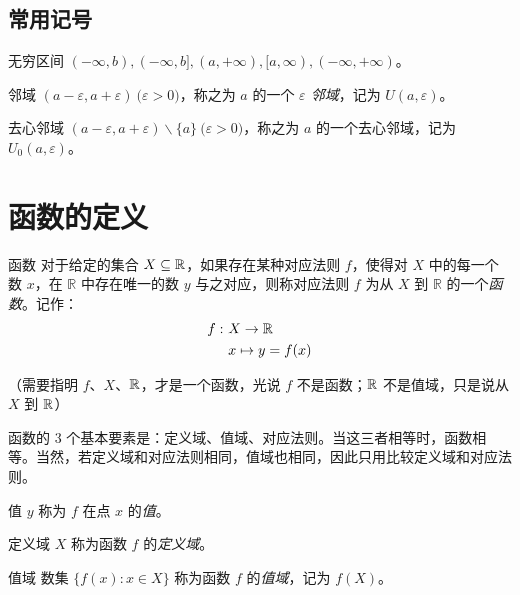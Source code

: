 \subsection{常用记号}

\begin{definition}{无穷区间}
	$(-\infty, b), (-\infty, b], (a, +\infty), [a, \infty), (-\infty, +\infty)$。
\end{definition}

\begin{definition}{邻域}
	$(a - \varepsilon, a + \varepsilon) \pod{\varepsilon > 0}$，称之为 $a$ 的一个 \emph{$\varepsilon$ 邻域}，记为 $U(a, \varepsilon)$。
\end{definition}

\begin{definition}{去心邻域}
	$(a - \varepsilon, a + \varepsilon) \backslash \{ a \} \pod{\varepsilon > 0}$，称之为 $a$ 的一个去心邻域，记为 $U_0(a, \varepsilon)$。
\end{definition}

\section{函数的定义}

\begin{definition}{函数}
	对于给定的集合 $X \subseteq \mathbb R$，如果存在某种对应法则 $f$，使得对 $X$ 中的每一个数 $x$，在 $\mathbb R$ 中存在唯一的数 $y$ 与之对应，则称对应法则 $f$ 为从 $X$ 到 $\mathbb R$ 的一个\emph{函数}。记作：
	$$
	\begin{aligned}
		f:~&X \rightarrow \mathbb R
		\\&
		x \mapsto y = f(x)
	\end{aligned}
	$$

	（需要指明 $f$、$X$、$\mathbb R$，才是一个函数，光说 $f$ 不是函数；$\mathbb R$ 不是值域，只是说从 $X$ 到 $\mathbb R$）
\end{definition}

函数的 3 个基本要素是：定义域、值域、对应法则。当这三者相等时，函数相等。当然，若定义域和对应法则相同，值域也相同，因此只用比较定义域和对应法则。

\begin{definition}{值}
	$y$ 称为 $f$ 在点 $x$ 的\emph{值}。
\end{definition}

\begin{definition}{定义域}
	$X$ 称为函数 $f$ 的\emph{定义域}。
\end{definition}

\begin{definition}{值域}
	数集 $\{f(x): x \in X\}$ 称为函数 $f$ 的\emph{值域}，记为 $f(X)$。
\end{definition}

